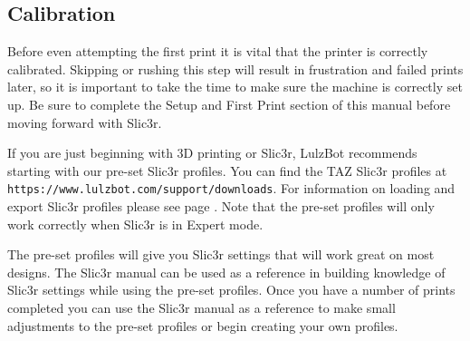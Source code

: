 
\subsection{Calibration}
\label{calibration}

Before even attempting the first print it is vital that the printer is correctly calibrated.  Skipping or rushing this step will result in frustration and failed prints later, so it is important to take the time to make sure the machine is correctly set up. Be sure to complete the Setup and First Print section of this manual before moving forward with Slic3r.

If you are just beginning with 3D printing or Slic3r, LulzBot recommends starting with our pre-set Slic3r profiles. You can find the TAZ Slic3r profiles at \texttt{https://www.lulzbot.com/support/downloads}. For information on loading and export Slic3r profiles please see page \pageref{sub:exporting_and_importing_configuration}. Note that the pre-set profiles will only work correctly when Slic3r is in Expert mode.

The pre-set profiles will give you Slic3r settings that will work great on most designs. The Slic3r manual can be used as a reference in building knowledge of Slic3r settings while using the pre-set profiles. Once you have a number of prints completed you can use the Slic3r manual as a reference to make small adjustments to the pre-set profiles or begin creating your own profiles.
